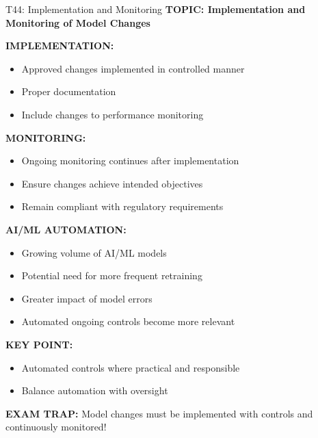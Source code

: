 \documentclass[8pt]{beamer}
\begin{document}
	\begin{frame}{T44: Implementation and Monitoring}
		\fontsize{6.5}{7.5}\selectfont
		\textbf{TOPIC: Implementation and Monitoring of Model Changes}
		
		\vspace{0.1cm}
		\textbf{IMPLEMENTATION:}
		\begin{itemize}
			\item Approved changes implemented in controlled manner
			\item Proper documentation
			\item Include changes to performance monitoring
		\end{itemize}
		
		\vspace{0.1cm}
		\textbf{MONITORING:}
		\begin{itemize}
			\item Ongoing monitoring continues after implementation
			\item Ensure changes achieve intended objectives
			\item Remain compliant with regulatory requirements
		\end{itemize}
		
		\vspace{0.1cm}
		\textbf{AI/ML AUTOMATION:}
		\begin{itemize}
			\item Growing volume of AI/ML models
			\item Potential need for more frequent retraining
			\item Greater impact of model errors
			\item Automated ongoing controls become more relevant
		\end{itemize}
		
		\vspace{0.1cm}
		\textbf{KEY POINT:}
		\begin{itemize}
			\item Automated controls where practical and responsible
			\item Balance automation with oversight
		\end{itemize}
		
		\textcolor{myred}{\textbf{EXAM TRAP:}} Model changes must be \textcolor{myblue}{implemented with controls and continuously monitored}!
	\end{frame}
	
\end{document}
